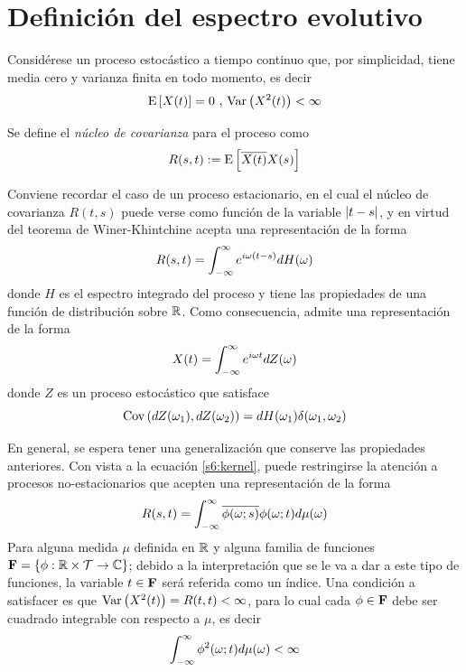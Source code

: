 \section{Definición del espectro evolutivo}
\label{sec:espectro}

Considérese un proceso estocástico a tiempo continuo \xtin{\R} que, por simplicidad, tiene media 
cero y varianza finita en todo momento, es decir
\begin{equation*}
\mathrm{E}\left[ X(t) \right] = 0 \text{  ,  } \mathrm{Var}\left( X^{2}(t) \right) < \infty
\end{equation*}

Se define el \textit{núcleo de covarianza} para el proceso como
\begin{equation}
R(s,t) := \mathrm{E}\left[ \overline{X(t)}X(s) \right]
\end{equation}

Conviene recordar el caso de un proceso estacionario, en el cual el núcleo de covarianza $R(t,s)$ 
puede verse como función de la variable $\left| t-s \right|$, y en virtud del teorema de Winer-Khintchine 
acepta una representación de la forma
%
\begin{equation}
R(s,t) = \int_{-\infty}^{\infty} e^{i \omega (t-s)} dH(\omega)
\label{s6:kernel}
\end{equation}
%
donde $H$ es el espectro integrado del proceso y tiene las propiedades de una función de 
distribución sobre $\mathbb{R}$.
%
Como consecuencia, \xtin{\R} admite una representación de la forma
\begin{equation}
X(t) = \int_{-\infty}^{\infty} e^{i\omega t} dZ(\omega)
\end{equation}
%
donde $Z$ es un proceso estocástico que satisface
\begin{equation}
\mathrm{Cov}\left( dZ(\omega_1),dZ(\omega_2) \right) = dH(\omega_1) \delta(\omega_1, \omega_2)
\end{equation}

En general, se espera tener una generalización que conserve las propiedades anteriores. Con vista
a la ecuación \ref{s6:kernel}, puede restringirse la atención a procesos no-estacionarios que
acepten una representación de la forma
\begin{equation}
R(s,t) = \int_{-\infty}^{\infty} \overline{\phi(\omega;s)}\phi(\omega;t) d\mu(\omega)
\label{s6:erre}
\end{equation}
%
Para alguna medida $\mu$ definida en $\mathbb{R}$ y alguna familia de funciones 
$\mathbf{F} = \left\{ \phi: \mathbb{R} \times \mathcal{T} \rightarrow \mathbb{C} \right\}$; debido a la interpretación que 
se le va a dar a este tipo de funciones, la variable $t\in \mathbf{F}$ será referida como un índice.
%
Una condición a satisfacer es que $\mathrm{Var}\left( X^{2}(t) \right) = R(t,t) < \infty$, para lo cual cada 
$\phi \in \mathbf{F}$ debe ser cuadrado integrable con respecto a $\mu$, es decir
\begin{equation}
\int_{-\infty}^{\infty} \phi^{2}(\omega;t) d\mu(\omega) < \infty
\end{equation}

